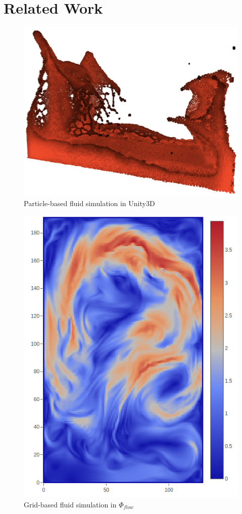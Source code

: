 \chapter{Related Work}\label{chapter:relatedwork}
\begin{figure}[t]
    \centering
	\includegraphics[scale=0.35]{figures/unity-sph2}

	\caption{Particle-based fluid simulation in Unity3D \parencite{unity3d} \parencite{mysph}}
\end{figure}
\begin{figure}[t]
    \centering
	\includegraphics[scale=0.85]{figures/phiflow}

	\caption{Grid-based fluid simulation in $\Phi_{flow}$}
\end{figure}


